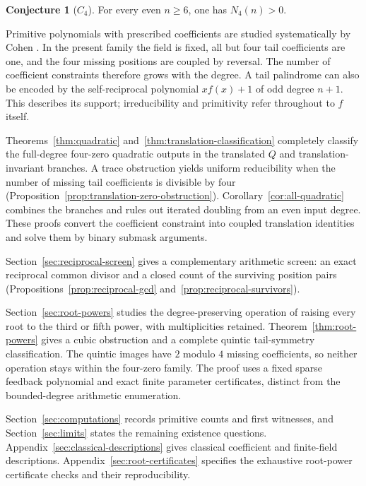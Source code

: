 \documentclass[11pt]{article}
\theoremstyle{definition}
\newtheorem{conjecture}[proposition]{Conjecture}
\theoremstyle{remark}
\begin{document}
\begin{conjecture}[$C_4$]\label{conj:C4}
For every even $n\ge6$, one has $N_4(n)>0$.
\end{conjecture}

Primitive polynomials with prescribed coefficients are studied systematically
by Cohen \cite{Coh06}. In the present family the field is fixed, all but four
tail coefficients are one, and the four missing positions are coupled by
reversal. The number of coefficient constraints therefore grows with the
degree. A tail palindrome can also be encoded by the self-reciprocal
polynomial $xf(x)+1$ of odd degree $n+1$. This describes its support;
irreducibility and primitivity refer throughout to $f$ itself.

Theorems~\ref{thm:quadratic} and~\ref{thm:translation-classification}
completely classify the full-degree four-zero quadratic outputs in the translated
$Q$ and translation-invariant branches. A trace obstruction yields
uniform reducibility when the number of missing tail coefficients is
divisible by four
(Proposition~\ref{prop:translation-zero-obstruction}).
Corollary~\ref{cor:all-quadratic} combines the branches and rules out
iterated doubling from an even input degree. These proofs convert
the coefficient constraint into coupled translation identities
and solve them by binary submask arguments.

Section~\ref{sec:reciprocal-screen} gives a complementary arithmetic
screen: an exact reciprocal common divisor and a closed count of
the surviving position pairs (Propositions~\ref{prop:reciprocal-gcd}
and~\ref{prop:reciprocal-survivors}).

Section~\ref{sec:root-powers} studies the degree-preserving operation
of raising every root to the third or fifth power, with multiplicities
retained. Theorem~\ref{thm:root-powers} gives a cubic obstruction and a
complete quintic tail-symmetry classification. The quintic images
have $2$ modulo $4$ missing coefficients, so neither operation stays
within the four-zero family. The proof uses a fixed sparse feedback
polynomial and exact finite parameter certificates, distinct from
the bounded-degree arithmetic enumeration.

Section~\ref{sec:computations} records primitive counts and first
witnesses, and Section~\ref{sec:limits} states the remaining
existence questions. Appendix~\ref{sec:classical-descriptions} gives
classical coefficient and finite-field descriptions.
Appendix~\ref{sec:root-certificates} specifies the exhaustive
root-power certificate checks and their reproducibility.
\end{document}
